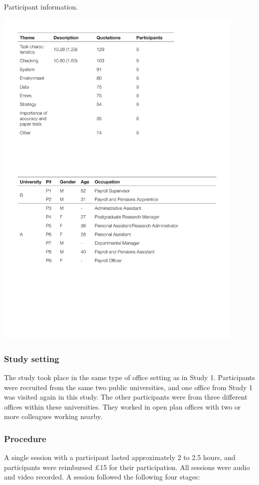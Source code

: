 \begin{table}
\caption{Participant information.}
\centering
\includegraphics[width=0.9\textwidth]{images/ch12/ch12_participants2.pdf}
\vspace{-3pt}
\label{tbl:ch12-part2}
\end{table}

\subsubsection{Study setting}
The study took place in the same type of office setting as in Study 1. Participants were recruited from the same two public universities, and one office from Study 1 was visited again in this study. The other participants were from three different offices within these universities. They worked in open plan offices with two or more colleagues working nearby. 

\subsubsection{Procedure}
A single session with a participant lasted approximately 2 to 2.5 hours, and participants were reimbursed \pounds 15 for their participation. All sessions were audio and video recorded. A session followed the following four stages:

